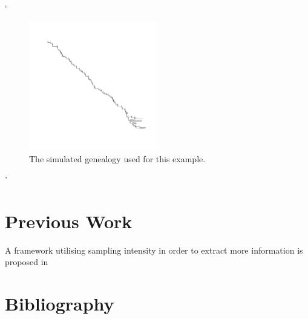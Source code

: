 \documentclass{report}
\theoremstyle{definition}
\begin{document}
`\begin{figure}[H]
  \centering
    \includegraphics[width=0.5\textwidth]{../R/test_mcmc/tree}
    \caption{The simulated genealogy used for this example.}
\end{figure}'
\section{Previous Work}
A framework utilising sampling intensity in order to extract more information is proposed in \cite{parag_jointly_nodate}
\section{Bibliography}
\printbibliography
\end{document}
